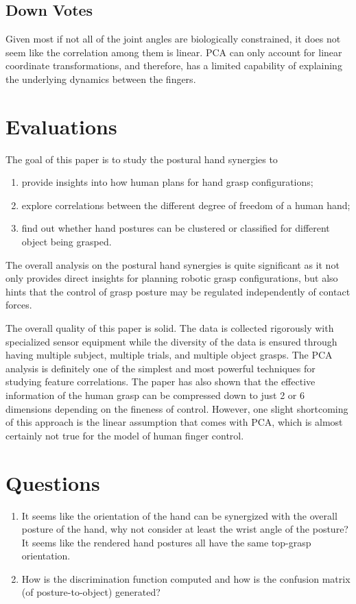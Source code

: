 \documentclass[10pt, twocolumn]{article}
\begin{document}
\subsection{Down Votes}
Given most if not all of the joint angles are biologically constrained,
it does not seem like the correlation among them is linear. PCA can 
only account for linear coordinate transformations, and therefore, has 
a limited capability of explaining the underlying dynamics between 
the fingers.

\section{Evaluations}

The goal of this paper is to study the postural hand synergies to 
\begin{enumerate}
    \item provide insights into how human plans for hand grasp configurations;
    \item explore correlations between the different degree of freedom of a human hand;
    \item find out whether hand postures can be clustered or classified for different
        object being grasped.
\end{enumerate}
The overall analysis on the postural hand synergies is quite significant as 
it not only provides direct insights for planning robotic grasp configurations,
but also hints that the control of grasp posture may be regulated independently 
of contact forces.

The overall quality of this paper is solid. The data is collected rigorously
with specialized sensor equipment while the diversity of the data is ensured 
through having multiple subject, multiple trials, and multiple object grasps.
The PCA analysis is definitely one of the simplest and most powerful techniques 
for studying feature correlations. The paper has also shown that the effective 
information of the human grasp can be compressed down to just 2 or 6 dimensions 
depending on the fineness of control. However, one slight 
shortcoming of this approach is the linear assumption that comes with PCA, 
which is almost certainly not true for the model of human finger control.

\section{Questions}
\begin{enumerate}
    \item It seems like the orientation of the hand can be synergized with 
        the overall posture of the hand, why not consider at least the wrist 
        angle of the posture? It seems like the rendered hand postures all 
        have the same top-grasp orientation.
    \item How is the discrimination function computed and how is the confusion 
        matrix (of posture-to-object) generated?
\end{enumerate}
\end{document}
